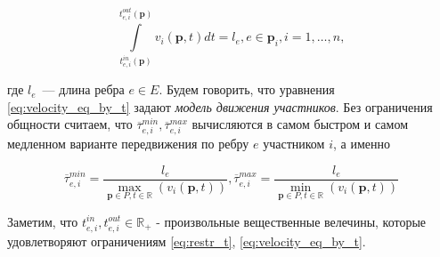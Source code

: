 \documentclass[12pt, a4paper]{article}
\begin{document}
\begin{equation}
	\label{eq:velocity_eq_by_t}
	\int\limits_{t_{e, i}^{in}(\textbf{p})}^{t_{e, i}^{out}(\textbf{p})} v_i(\textbf{p}, t) dt = l_e, e \in \textbf{p}_i, i = 1, \dots, n,
\end{equation}

где $l_e$~--- длина ребра $e \in E$. Будем говорить, что уравнения \eqref{eq:velocity_eq_by_t} задают \textit{модель движения участников}. Без ограничения общности считаем, что $\overline{\tau}_{e, i}^{min}, \overline{\tau}_{e, i}^{max}$ вычисляются в самом быстром и самом медленном варианте передвижения по ребру $e$ участником $i$, а именно

\begin{equation}
	\label{eq:restr_add_concrete}
	\overline{\tau}_{e, i}^{min} = \frac{l_e}{\max\limits_{\textbf{p} \in P, t \in \mathbb{R}} \left(  v_i(\textbf{p}, t) \right)}, \overline{\tau}_{e, i}^{max} = \frac{l_e}{\min\limits_{\textbf{p} \in P, t \in \mathbb{R}} \left(  v_i(\textbf{p}, t) \right)}
\end{equation}

Заметим, что $t_{e, i}^{in}, t_{e, i}^{out} \in \mathbb{R}_+$ - произвольные вещественные велечины, которые удовлетворяют ограничениям \eqref{eq:restr_t}, \eqref{eq:velocity_eq_by_t}.
\end{document}
